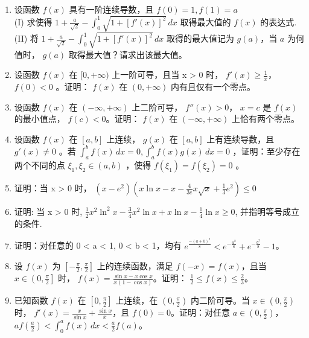 \documentclass[12pt, a4paper]{ctexart}
\begin{document}
\begin{enumerate}[start=37]
    \item 设函数 $ f(x) $ 具有一阶连续导数，且 $ f(0)=1, f(1)=a $\\
    (I) 求使得 $ 1 + \frac{a}{\sqrt{2}} - \int_{0}^{1} \sqrt{1 + \left[ f'(x) \right]^{2}} \, dx $ 取得最大值的 $ f(x) $ 的表达式.\\
    (II) 将 $ 1 + \frac{a}{\sqrt{2}} - \int_{0}^{1} \sqrt{1 + \left[ f'(x) \right]^2} \, dx $ 取得的最大值记为 $ g(a) $，当 $ a $ 为何值时， $ g(a) $ 取得最大值？请求出该最大值。

    \item 设函数 $ f(x) $ 在 $ [0, +\infty) $ 上一阶可导，且当 x > 0 时， $ f'(x) \geq \frac{1}{x} $， $ f(0) < 0 $ 。证明： $ f(x) $ 在 $ (0, +\infty) $ 内有且仅有一个零点。

    \item 设函数 $ f(x) $ 在 $ (-\infty, +\infty) $ 上二阶可导， $ f''(x) > 0 $， $ x = c $ 是 $ f(x) $ 的最小值点， $ f(c) < 0 $。证明： $ f(x) $ 在 $ (-\infty, +\infty) $ 上恰有两个零点。

    \item 设函数 $ f(x) $ 在 $ [a,b] $ 上连续， $ g(x) $ 在 $ [a,b] $ 上有连续导数，且 $ g'(x) \neq 0 $ 。若 $ \int_{a}^{b} f(x) \, dx = 0, \int_{a}^{b} f(x) g(x) \, dx = 0 $ ，证明：至少存在两个不同的点 $ \xi_1, \xi_2 \in (a,b) $ ，使得 $ f(\xi_1) = f(\xi_2) = 0 $ 。

    \item 证明：当 x > 0 时， $ \left(x - e^{2}\right)\left(x \ln x - x - \frac{4}{3e}x \sqrt{x} + \frac{1}{3}e^{2}\right) \leq 0 $

    \item 证明: 当 x > 0 时, $ \frac{1}{2}x^{2}\ln^{2}x - \frac{3}{4}x^{2}\ln x + x\ln x - \frac{1}{4}\ln x \geq 0 $, 并指明等号成立的条件.

    \item 证明：对任意的 0 < a < 1, 0 < b < 1，均有 $ e^{\frac{-(a+b)^{2}}{8}} < e^{-\frac{a^{2}}{8}} + e^{-\frac{b^{2}}{8}} - 1 $。

    \item 设 $ f(x) $ 为 $ \left[-\frac{\pi}{2}, \frac{\pi}{2}\right] $ 上的连续函数，满足 $ f(-x) = f(x) $，且当 $ x \in \left(0, \frac{\pi}{2}\right] $ 时， $ f(x) = \frac{\sin x - x \cos x}{x(1 - \cos x)} $。证明： $ \frac{1}{2} \leq f(x) \leq \frac{2}{3} $。

    \item 已知函数 $ f(x) $ 在 $ \left[0, \frac{\pi}{2}\right] $ 上连续，在 $ \left(0, \frac{\pi}{2}\right) $ 内二阶可导。当 $ x \in \left(0, \frac{\pi}{2}\right) $ 时， $ f'(x) = \frac{x}{\sin x} + \frac{\sin x}{x} $，且 $ f(0) = 0 $。证明：对任意 $ a \in \left(0, \frac{\pi}{2}\right) $， $ af\left(\frac{a}{2}\right) < \int_{0}^{a} f(x) \, dx < \frac{a}{2}f(a) $。


\end{enumerate}
\end{document}
